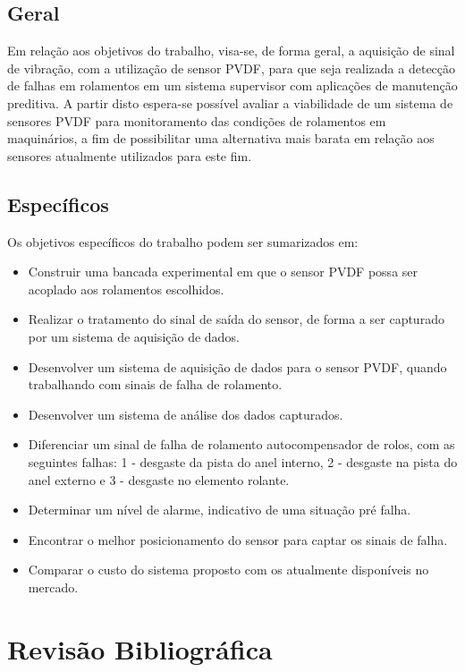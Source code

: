 \documentclass[
	12pt,				
	oneside,			
	a4paper,			
	english,			
	brazil,			
	]{abntex2ppgsi}
\begin{document}
\section{\textbf {Geral}}

Em relação aos objetivos do trabalho, visa-se, de forma geral, a aquisição de sinal de vibração, com a utilização de sensor PVDF, para que seja realizada a detecção de falhas em rolamentos em um sistema supervisor com aplicações de manutenção preditiva. A partir disto espera-se possível avaliar a viabilidade de um sistema de sensores PVDF para monitoramento das condições de rolamentos em maquinários, a fim de possibilitar uma alternativa mais barata em relação aos sensores atualmente utilizados para este fim.

\section{\textbf {Específicos}}

Os objetivos específicos do trabalho podem ser sumarizados em:

\begin{itemize}
	\item Construir uma bancada experimental em que o sensor PVDF possa ser acoplado aos rolamentos escolhidos.
	\item Realizar o tratamento do sinal de saída do sensor, de forma a ser capturado por um sistema de aquisição de dados.
	\item Desenvolver um sistema de aquisição de dados para o sensor PVDF, quando trabalhando com sinais de falha de rolamento.
	\item Desenvolver um sistema de análise dos dados capturados.
	\item Diferenciar um sinal de falha de rolamento autocompensador de rolos, com as seguintes falhas: 1 - desgaste da pista do anel interno, 2 - desgaste na pista do anel externo e 3 - desgaste no elemento rolante.
	\item Determinar um nível de alarme, indicativo de uma situação pré falha.
	\item Encontrar o melhor posicionamento do sensor para captar os sinais de falha.
	\item Comparar o custo do sistema proposto com os atualmente disponíveis no mercado.
\end{itemize}

\chapter{Revisão Bibliográfica}
\end{document}
